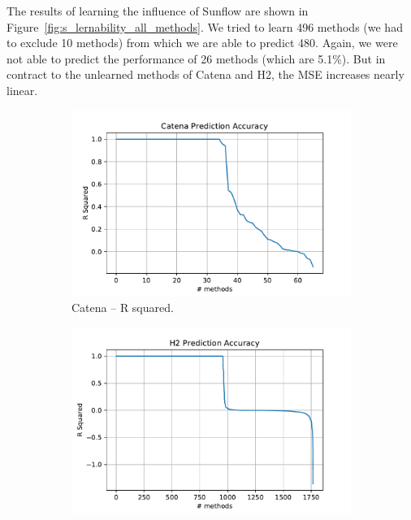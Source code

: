 The results of learning the influence of Sunflow are shown in Figure~\ref{fig:s_lernability_all_methods}. We tried to learn 496 methods (we had to exclude 10 methods) from which we are able to predict 480. Again, we were not able to predict the performance of 26 methods (which are 5.1\%). But in contract to the unlearned methods of Catena and H2, the \ac{MSE} increases nearly linear.


\begin{figure}[h]
	\centering
	\begin{subfigure}{.5\textwidth}
	  \centering
	  \includegraphics[width=.99\linewidth]{images/Catena_plt_learnable_func_all_model_r_sq}
	  \caption{Catena -- R squared.}
	  \label{fig:catena_model_r_sq}
	\end{subfigure}%
	\begin{subfigure}{.5\textwidth}
	  \centering
	  \includegraphics[width=.99\linewidth]{images/H2_plt_learnable_func_all_model_r_sq}

\end{subfigure}
\end{figure}
